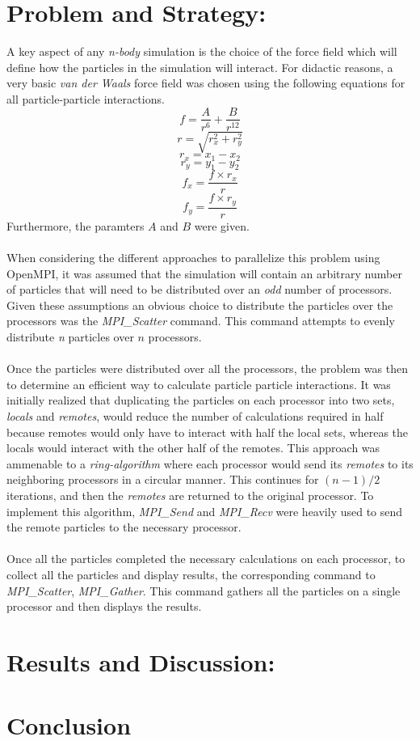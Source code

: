 \documentclass{article}
\begin{document}
\section*{Problem and Strategy:}
A key aspect of any \textit{n-body} simulation is the choice
of the force field which will define how the particles in the 
simulation will interact.  For didactic reasons, a very basic
\textit{van der Waals} force field was chosen using the following
equations for all particle-particle interactions.
\[
f = \frac{A}{r^6} + \frac{B}{r^{12}}
\]
\[
r = \sqrt{r_x^2 + r_y^2}
\]
\[
r_x = x_1 - x_2
\]
\[
r_y = y_1 - y_2
\]
\[
f_x = \frac{f\times r_x}{r}
\]
\[
f_y = \frac{f\times r_y}{r}
\]
Furthermore, the paramters $A$ and $B$ were given.\\\\
When considering the different approaches to parallelize this
problem using OpenMPI, it was assumed that the simulation
will contain an arbitrary number of particles that will need
to be distributed over an \textit{odd} number of processors.
Given these assumptions an obvious choice to distribute the 
particles over the processors was the \textit{MPI\_Scatter}
command.  This command attempts to evenly distribute
\textit{n} particles over $n$ processors.\\\\
Once the particles were distributed over all the processors,
the problem was then to determine an efficient way to
calculate particle particle interactions.   It was initially
realized that duplicating the particles on each processor into
two sets, \textit{locals} and \textit{remotes}, would reduce
the number of calculations required in half because remotes
would only have to interact with half the local sets, whereas
the locals would interact with the other half of the remotes.
This approach was ammenable to a \textit{ring-algorithm}
where each processor would send its \textit{remotes} to
its neighboring processors in a circular manner.  This 
continues for $(n-1)/2$ iterations, and then the \textit{remotes}
are returned to the original processor.  To implement this algorithm,
\textit{MPI\_Send} and \textit{MPI\_Recv} were heavily used to
send the remote particles to the necessary processor.\\\\
Once all the particles completed the necessary calculations on
each processor, to collect all the particles and display results,
the corresponding command to \textit{MPI\_Scatter}, \textit{MPI\_Gather}.
This command gathers all the particles on a single processor
and then displays the results. 
\section*{Results and Discussion:}

\section*{Conclusion}
\end{document}
